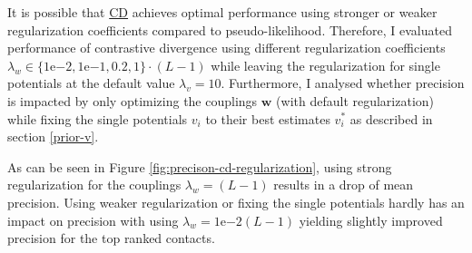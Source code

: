 \documentclass[12pt,a4paper,twoside]{book}
\newcommand{\eq}{\!=\!}
\newcommand{\vi}{v_{i}}
\newcommand{\w}{\mathbf{w}}
\theoremstyle{definition}
\theoremstyle{definition}
\theoremstyle{remark}
\begin{document}
It is possible that \protect\hyperlink{abbrev}{CD} achieves optimal
performance using stronger or weaker regularization coefficients
compared to pseudo-likelihood. Therefore, I evaluated performance of
contrastive divergence using different regularization coefficients
\(\lambda_w \in \{ 1\mathrm{e}{-2}, 1\mathrm{e}{-1}, 0.2, 1\} \cdot(L-1)\)
while leaving the regularization for single potentials at the default
value \(\lambda_v \eq 10\). Furthermore, I analysed whether precision is
impacted by only optimizing the couplings \(\w\) (with default
regularization) while fixing the single potentials \(\vi\) to their best
estimates \(\vi^*\) as described in section \ref{prior-v}.

As can be seen in Figure \ref{fig:precison-cd-regularization}, using
strong regularization for the couplings \(\lambda_w \eq (L-1)\) results
in a drop of mean precision. Using weaker regularization or fixing the
single potentials hardly has an impact on precision with using
\(\lambda_w \eq 1\mathrm{e}{-2}(L-1)\) yielding slightly improved
precision for the top ranked contacts.
\end{document}
